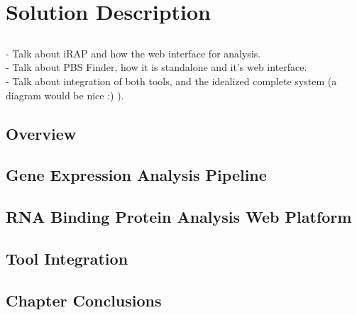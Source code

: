\chapter{Solution Description} \label{chap:description}

\section*{}

\begin{Notes}
- Talk about iRAP and how the web interface for analysis.\\
- Talk about PBS Finder, how it is standalone and it's web interface.\\
- Talk about integration of both tools, and the idealized complete system (a
diagram would be nice :) ).\\
\end{Notes}

\section{Overview}

\section{Gene Expression Analysis Pipeline}

\section{RNA Binding Protein Analysis Web Platform}

\section{Tool Integration}

\section{Chapter Conclusions}
